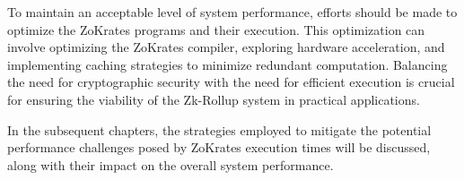 To maintain an acceptable level of system performance, efforts should be made to optimize the ZoKrates programs and their execution. This optimization can involve optimizing the ZoKrates compiler, exploring hardware acceleration, and implementing caching strategies to minimize redundant computation. Balancing the need for cryptographic security with the need for efficient execution is crucial for ensuring the viability of the Zk-Rollup system in practical applications.

In the subsequent chapters, the strategies employed to mitigate the potential performance challenges posed by ZoKrates execution times will be discussed, along with their impact on the overall system performance.


